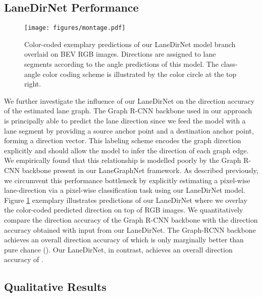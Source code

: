 \documentclass[letterpaper, 10 pt, conference]{ieeeconf}
\begin{document}
\subsection{LaneDirNet Performance}



\begin{figure}
\centering
\texttt{[image: figures/montage.pdf]}
    \caption{Color-coded exemplary predictions of our LaneDirNet model branch overlaid on BEV RGB images. Directions are assigned to lane segments according to the angle predictions of this model. The class-angle color coding scheme is illustrated by the color circle at the top right.}
    \label{fig:lanedirnet} 
\end{figure}






We further investigate the influence of our LaneDirNet on the direction accuracy of the estimated lane graph. The Graph R-CNN backbone \cite{yang2018graph} used in our approach is principally able to predict the lane direction since we feed the model with a lane segment by providing a source anchor point and a destination anchor point, forming a direction vector. This labeling scheme encodes the graph direction explicitly and should allow the model to infer the direction of each graph edge. We empirically found that this relationship is modelled poorly by the Graph R-CNN backbone present in our LaneGraphNet framework. As described previously, we circumvent this performance bottleneck by explicitly estimating a pixel-wise lane-direction via a pixel-wise classification task using our LaneDirNet model. Figure \ref{fig:lanedirnet} exemplary illustrates predictions of our LaneDirNet where we overlay the color-coded predicted direction on top of RGB images. We quantitatively compare the direction accuracy of the Graph R-CNN backbone with the direction accuracy obtained with input from our LaneDirNet. The Graph-RCNN backbone achieves an overall direction accuracy of  which is only marginally better than pure chance (). Our LaneDirNet, in contrast, achieves an overall direction accuracy of .




\subsection{Qualitative Results}
\end{document}
